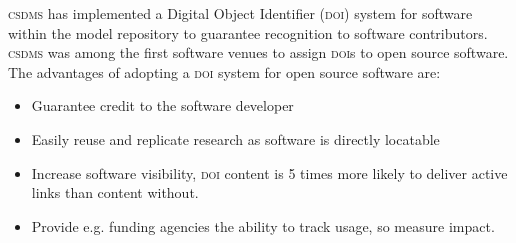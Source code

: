 \documentclass[11pt, oneside]{amsart}
\DeclareRobustCommand{\csdms}{\textsc{csdms}}
\DeclareRobustCommand{\doi}{\textsc{doi}}
\begin{document}

\csdms{} has implemented a
Digital Object Identifier (\doi{}) system for software within the model
repository to guarantee recognition to software contributors.
\csdms{} was among the first software venues to assign \doi{}s to
open source software. The advantages of adopting a \doi{} system for open
source software are: 
\begin{itemize}
\item Guarantee credit to the software developer
\item Easily reuse and replicate research as software is directly locatable 
\item Increase software visibility, \doi{} content is 5 times more likely to
      deliver active links than content without.
\item Provide e.g. funding agencies the ability to track usage, so measure
      impact.
\end{itemize}


\end{document}
